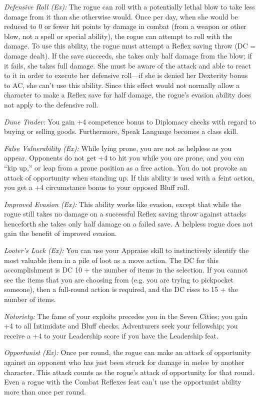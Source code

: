\textit{Defensive Roll (Ex):} The rogue can roll with a potentially lethal blow to take less damage from it than she otherwise would. Once per day, when she would be reduced to 0 or fewer hit points by damage in combat (from a weapon or other blow, not a spell or special ability), the rogue can attempt to roll with the damage. To use this ability, the rogue must attempt a Reflex saving throw (DC = damage dealt). If the save succeeds, she takes only half damage from the blow; if it fails, she takes full damage. She must be aware of the attack and able to react to it in order to execute her defensive roll—if she is denied her Dexterity bonus to AC, she can't use this ability. Since this effect would not normally allow a character to make a Reflex save for half damage, the rogue's evasion ability does not apply to the defensive roll.

\textit{Dune Trader:} You gain +4 competence bonus to Diplomacy checks with regard to buying or selling goods. Furthermore, Speak Language becomes a class skill.

\textit{False Vulnerability (Ex):} While lying prone, you are not as helpless as you appear. Opponents do not get +4 to hit you while you are prone, and you can ``kip up,'' or leap from a prone position as a free action. You do not provoke an attack of opportunity when standing up. If this ability is used with a feint action, you get a +4 circumstance bonus to your opposed Bluff roll.

\textit{Improved Evasion (Ex):} This ability works like evasion, except that while the rogue still takes no damage on a successful Reflex saving throw against attacks henceforth she takes only half damage on a failed save. A helpless rogue does not gain the benefit of improved evasion.

\textit{Looter's Luck (Ex):} You can use your Appraise skill to instinctively identify the most valuable item in a pile of loot as a move action. The DC for this accomplishment is DC 10 + the number of items in the selection. If you cannot see the items that you are choosing from (e.g. you are trying to pickpocket someone), then a full-round action is required, and the DC rises to 15 + the number of items.

\textit{Notoriety:} The fame of your exploits precedes you in the Seven Cities; you gain +4 to all Intimidate and Bluff checks. Adventurers seek your fellowship; you receive a +4 to your Leadership score if you have the Leadership feat.

\textit{Opportunist (Ex):} Once per round, the rogue can make an attack of opportunity against an opponent who has just been struck for damage in melee by another character. This attack counts as the rogue's attack of opportunity for that round. Even a rogue with the Combat Reflexes feat can't use the opportunist ability more than once per round.

